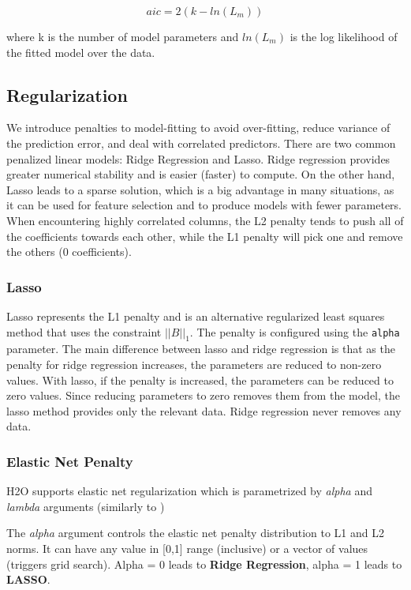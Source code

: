 \documentclass[11pt]{article}
\begin{document}
\[ aic = 2(k - ln(L_{m}))\]

\noindent
where k is the number of model parameters and $ln(L_{m})$ is the log likelihood of the fitted model over the data.


\subsection{Regularization} 
We introduce penalties to model-fitting to avoid over-fitting, reduce variance of the prediction error, and deal with correlated predictors. There are two common penalized linear models: Ridge Regression and Lasso. Ridge regression provides greater numerical stability and is easier (faster) to compute. On the other hand, Lasso leads to a sparse solution, which is a big advantage in many situations, as it can be used for feature selection and to produce models with fewer parameters. When encountering highly correlated columns, the L2 penalty tends to push all of the coefficients towards each other, while the L1 penalty will pick one and remove the others (0 coefficients).

\subsubsection{Lasso}

Lasso represents the L1 penalty and is an alternative regularized least squares method that uses the constraint $||B||_1$. The penalty is configured using the \texttt{alpha} parameter. The main difference between lasso and ridge regression is that as the penalty for ridge regression increases, the parameters are reduced to non-zero values. With lasso, if the penalty is increased, the parameters can be reduced to zero values. Since reducing parameters to zero removes them from the model, the lasso method provides only the relevant data. Ridge regression never removes any data. 

\subsubsection{Elastic Net Penalty}

H2O supports elastic net regularization which is parametrized by \textit{alpha} and \textit{lambda} arguments (similarly to \cite{glmnet})

The \textit{alpha} argument controls the elastic net penalty distribution to L1 and L2 norms. It can have any value in [0,1] range (inclusive) or a vector of values (triggers grid search). Alpha = 0 leads to \textbf{Ridge Regression}, alpha = 1 leads to \textbf{LASSO}.  
\end{document}
